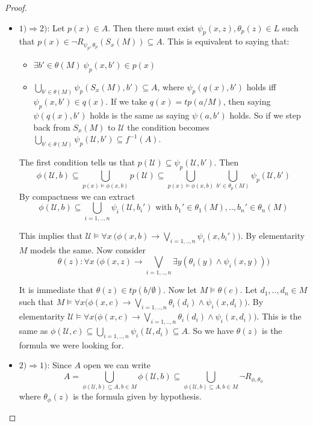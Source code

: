 \documentclass{article}
\begin{document}
\begin{proof}

	\begin{itemize}
		\item	$1) \Rightarrow 2)$: 
			Let $p(x) \in A$. Then there must exist $\psi_p(x,z), \theta_p(z) \in L$ such that $p(x) \in \neg R_{\psi_p,\theta_p}(S_x(M)) \subseteq A$.
			This is equivalent to saying that:
			\begin{itemize}
				\item	$\exists b' \in \theta(M) \ \psi_p(x,b') \in p(x)$
				\item	$\bigcup_{b' \in \theta(M)} \psi_p(S_x(M),b') \subseteq A$, where $\psi_p(q(x),b')$ holds iff $\psi_p(x,b') \in q(x)$.
					If we take $q(x) = tp(a/M)$, then saying $\psi(q(x),b')$ holds is the same as saying $\psi(a,b')$ holds.
					So if we step back from $S_x(M)$ to $\mathcal{U}$ the condition becomes $\bigcup_{b' \in \theta(M)} \psi_p(\mathcal{U},b') \subseteq f^{-1}(A)$.
			\end{itemize}

			The first condition tells us that $p(\mathcal{U}) \subseteq \psi_p(\mathcal{U},b')$.
			Then 
			\[
				\phi(\mathcal{U},b) \subseteq \bigcup_{p(x) \models \phi(x,b)} p(\mathcal{U}) 
				\subseteq \bigcup_{p(x) \models \phi(x,b)} \bigcup_{b' \in \theta_p(M)} \psi_p(\mathcal{U},b')
			\]
			By compactness we can extract 
			\[
				\phi(\mathcal{U},b) \subseteq \bigcup_{i = 1,..,n} \psi_i(\mathcal{U},b_i') \text{ with } b_1' \in \theta_1(M),.., b_n' \in \theta_n(M)
			\]

			This implies that $\mathcal{U} \models \forall x \ \bigg( \phi(x,b) \to \bigvee_{i = 1,..,n} \psi_i(x,b_i') \bigg)$.
			By elementarity $M$ models the same. Now consider 
			\[
				\theta(z) : \forall x \ \bigg( \phi(x,z) \to \bigvee_{i = 1,..,n} \exists y (\theta_i(y) \land \psi_i(x,y)) \bigg)
			\]

			It is immediate that $\theta(z) \in tp(b/\emptyset)$.
			Now let $M \models \theta(c)$. Let $d_1,..,d_n \in M$ such that $M \models \forall x \bigg( \phi(x,c) \to \bigvee_{i = 1,..,n} \theta_i(d_i) \land \psi_i(x,d_i) \bigg)$.
			By elementarity $\mathcal{U} \models \forall x \bigg( \phi(x,c) \to \bigvee_{i = 1,..,n} \theta_i(d_i) \land \psi_i(x,d_i) \bigg)$.
			This is the same as $\phi(\mathcal{U},c) \subseteq \bigcup_{i = 1,..,n} \psi_i(\mathcal{U},d_i) \subseteq A$.
			So we have $\theta(z)$ is the formula we were looking for.

		\item	$2) \Rightarrow 1)$:
			Since $A$ open we can write 
			\[
				A = \bigcup_{\phi(\mathcal{U},b) \subseteq A, b \in M} \phi(\mathcal{U},b) \subseteq 
				\bigcup_{\phi(\mathcal{U},b) \subseteq A, b \in M} \neg R_{\phi,\theta_{\phi}}
			\]
			where $\theta_\phi (z) $ is the formula given by hypothesis.

	\end{itemize}

\end{proof}
\end{document}
